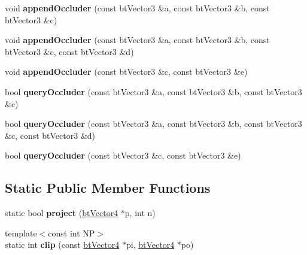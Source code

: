 \begin{DoxyCompactItemize}
\item 
\hypertarget{struct_occlusion_buffer_a42198dffc38161cf5bf48b52ca8e299e}{void {\bfseries append\+Occluder} (const bt\+Vector3 \&a, const bt\+Vector3 \&b, const bt\+Vector3 \&c)}\label{struct_occlusion_buffer_a42198dffc38161cf5bf48b52ca8e299e}

\item 
\hypertarget{struct_occlusion_buffer_a48412001423fbff3943dcb95eb69c5e6}{void {\bfseries append\+Occluder} (const bt\+Vector3 \&a, const bt\+Vector3 \&b, const bt\+Vector3 \&c, const bt\+Vector3 \&d)}\label{struct_occlusion_buffer_a48412001423fbff3943dcb95eb69c5e6}

\item 
\hypertarget{struct_occlusion_buffer_acd240e3b4b158575f78bc25d58f89784}{void {\bfseries append\+Occluder} (const bt\+Vector3 \&c, const bt\+Vector3 \&e)}\label{struct_occlusion_buffer_acd240e3b4b158575f78bc25d58f89784}

\item 
\hypertarget{struct_occlusion_buffer_ae2bf6abf86dfb5f72b3588932eda9727}{bool {\bfseries query\+Occluder} (const bt\+Vector3 \&a, const bt\+Vector3 \&b, const bt\+Vector3 \&c)}\label{struct_occlusion_buffer_ae2bf6abf86dfb5f72b3588932eda9727}

\item 
\hypertarget{struct_occlusion_buffer_a8469a82bbbce934ab7389008d4b41287}{bool {\bfseries query\+Occluder} (const bt\+Vector3 \&a, const bt\+Vector3 \&b, const bt\+Vector3 \&c, const bt\+Vector3 \&d)}\label{struct_occlusion_buffer_a8469a82bbbce934ab7389008d4b41287}

\item 
\hypertarget{struct_occlusion_buffer_aa50a37ed1f97f43558bef9b41439162b}{bool {\bfseries query\+Occluder} (const bt\+Vector3 \&c, const bt\+Vector3 \&e)}\label{struct_occlusion_buffer_aa50a37ed1f97f43558bef9b41439162b}

\end{DoxyCompactItemize}
\subsection*{Static Public Member Functions}
\begin{DoxyCompactItemize}
\item 
\hypertarget{struct_occlusion_buffer_a83098b35dcdab3a58ac7fdc240ecc45f}{static bool {\bfseries project} (\hyperlink{classbt_vector4}{bt\+Vector4} $\ast$p, int n)}\label{struct_occlusion_buffer_a83098b35dcdab3a58ac7fdc240ecc45f}

\item 
\hypertarget{struct_occlusion_buffer_ab14e300150ae5366a916fc97e755827e}{{\footnotesize template$<$const int N\+P$>$ }\\static int {\bfseries clip} (const \hyperlink{classbt_vector4}{bt\+Vector4} $\ast$pi, \hyperlink{classbt_vector4}{bt\+Vector4} $\ast$po)}\label{struct_occlusion_buffer_ab14e300150ae5366a916fc97e755827e}

\end{DoxyCompactItemize}
